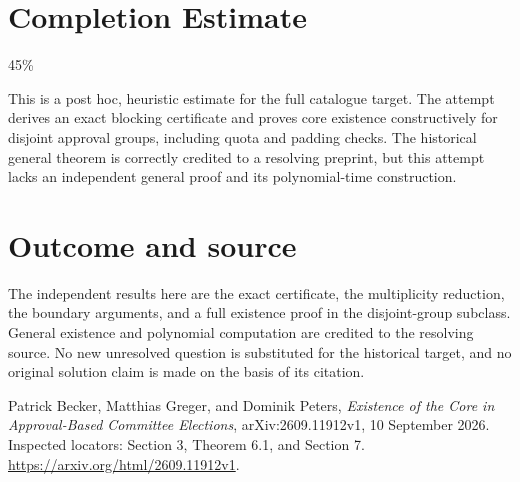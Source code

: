 \documentclass[11pt]{article}
\begin{document}
\section{Completion Estimate}
45\%

This is a post hoc, heuristic estimate for the full catalogue target.
The attempt derives an exact blocking certificate and proves core existence constructively for disjoint approval groups, including quota and padding checks. The historical general theorem is correctly credited to a resolving preprint, but this attempt lacks an independent general proof and its polynomial-time construction.

\section*{Outcome and source}
The independent results here are the exact certificate, the multiplicity
reduction, the boundary arguments, and a full existence proof in the
disjoint-group subclass. General existence and polynomial computation
are credited to the resolving source. No new unresolved question is
substituted for the historical target, and no original solution claim
is made on the basis of its citation.

Patrick Becker, Matthias Greger, and Dominik Peters,
\emph{Existence of the Core in Approval-Based Committee Elections},
arXiv:2609.11912v1, 10 September 2026. Inspected locators: Section 3,
Theorem 6.1, and Section 7.
\url{https://arxiv.org/html/2609.11912v1}.
\end{document}
